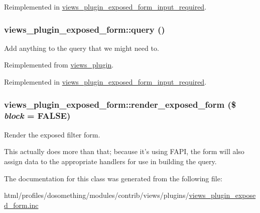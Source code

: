 Reimplemented in \hyperlink{classviews__plugin__exposed__form__input__required_a11f06f82df74f11ecb72da72d0d3a1d5}{views\_\-plugin\_\-exposed\_\-form\_\-input\_\-required}.\hypertarget{classviews__plugin__exposed__form_a6e0fedda54c9532c3827b0b97807ac7e}{
\subsubsection[{query}]{\setlength{\rightskip}{0pt plus 5cm}views\_\-plugin\_\-exposed\_\-form::query ()}}
\label{classviews__plugin__exposed__form_a6e0fedda54c9532c3827b0b97807ac7e}
Add anything to the query that we might need to. 

Reimplemented from \hyperlink{classviews__plugin_a10ac07c47c4a8735786f9fcc38548587}{views\_\-plugin}.

Reimplemented in \hyperlink{classviews__plugin__exposed__form__input__required_a452e5c16da60d3b51cdc56335ca3d3e8}{views\_\-plugin\_\-exposed\_\-form\_\-input\_\-required}.\hypertarget{classviews__plugin__exposed__form_a6eec58838976404573957671fd73a63b}{
\subsubsection[{render\_\-exposed\_\-form}]{\setlength{\rightskip}{0pt plus 5cm}views\_\-plugin\_\-exposed\_\-form::render\_\-exposed\_\-form (\$ {\em block} = {\ttfamily FALSE})}}
\label{classviews__plugin__exposed__form_a6eec58838976404573957671fd73a63b}
Render the exposed filter form.

This actually does more than that; because it's using FAPI, the form will also assign data to the appropriate handlers for use in building the query. 

The documentation for this class was generated from the following file:\begin{DoxyCompactItemize}
\item 
html/profiles/dosomething/modules/contrib/views/plugins/\hyperlink{views__plugin__exposed__form_8inc}{views\_\-plugin\_\-exposed\_\-form.inc}\end{DoxyCompactItemize}
